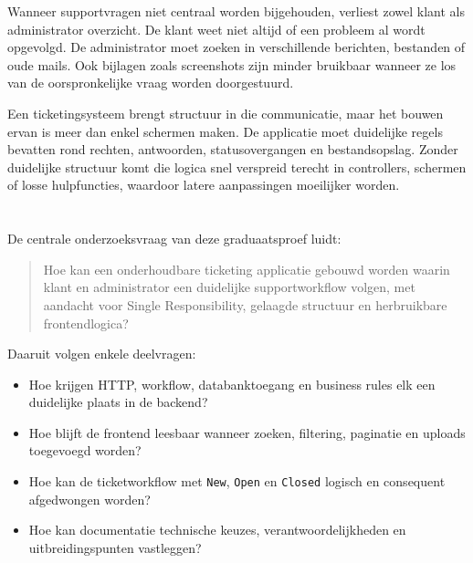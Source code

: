 
Wanneer supportvragen niet centraal worden bijgehouden, verliest zowel klant als administrator overzicht. De klant weet niet altijd of een probleem al wordt opgevolgd. De administrator moet zoeken in verschillende berichten, bestanden of oude mails. Ook bijlagen zoals screenshots zijn minder bruikbaar wanneer ze los van de oorspronkelijke vraag worden doorgestuurd.

Een ticketingsysteem brengt structuur in die communicatie, maar het bouwen ervan is meer dan enkel schermen maken. De applicatie moet duidelijke regels bevatten rond rechten, antwoorden, statusovergangen en bestandsopslag. Zonder duidelijke structuur komt die logica snel verspreid terecht in controllers, schermen of losse hulpfuncties, waardoor latere aanpassingen moeilijker worden.

\section{}%
\label{sec:onderzoeksvraag}


De centrale onderzoeksvraag van deze graduaatsproef luidt:

\begin{quote}\small
Hoe kan een onderhoudbare ticketing applicatie gebouwd worden waarin klant en administrator een duidelijke supportworkflow volgen, met aandacht voor Single Responsibility, gelaagde structuur en herbruikbare frontendlogica?
\end{quote}

Daaruit volgen enkele deelvragen:

\begin{itemize}[itemsep=0.1\baselineskip, topsep=0.25\baselineskip]
  \item Hoe krijgen HTTP, workflow, databanktoegang en business rules elk een duidelijke plaats in de backend?
  \item Hoe blijft de frontend leesbaar wanneer zoeken, filtering, paginatie en uploads toegevoegd worden?
  \item Hoe kan de ticketworkflow met \texttt{New}, \texttt{Open} en \texttt{Closed} logisch en consequent afgedwongen worden?
  \item Hoe kan documentatie technische keuzes, verantwoordelijkheden en uitbreidingspunten vastleggen?
\end{itemize}

